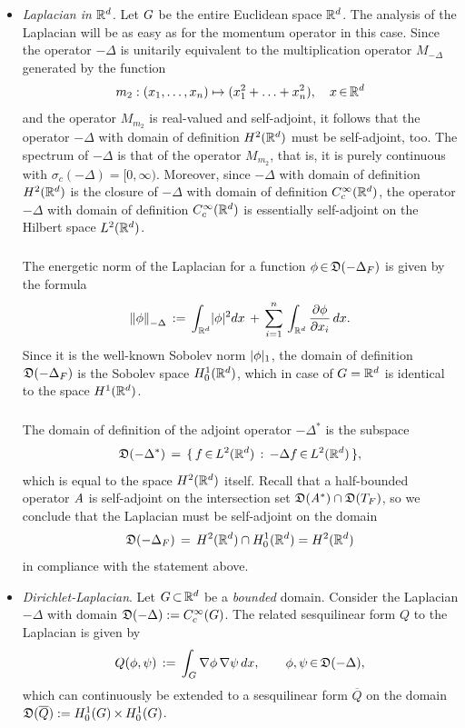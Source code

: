 \documentclass[11pt,twoside]{article}
\begin{document}
\begin{itemize}[leftmargin=5mm]
\item[1.]
\textit{Laplacian in ${\mathbb{R}}^d$}.
Let $G$ be the entire Euclidean space ${\mathbb{R}}^d$.
The analysis of the Laplacian will be as easy as for the momentum operator
in this case.
Since the operator $-\Delta$ is unitarily equivalent to
the multiplication operator $M_{-\Delta}$ generated by the function
\[
m_2:(x_1,\ldots,x_n) \mapsto (x_1^2 + \ldots + x_n^2), \quad x {\,\in\,} {\mathbb{R}}^d
\]
and the operator $M_{m_2}$ is real-valued and self-adjoint,
it follows
that the operator $-\Delta$ with domain of definition $H^2({\mathbb{R}}^d)$
must be self-adjoint,
too.
The spectrum of $-\Delta$ is that of the operator $M_{m_2}$,
that is,
it is purely continuous with $\sigma_c(-\Delta)=[0,\infty)$.
Moreover,
since $-\Delta$ with domain of definition $H^2({\mathbb{R}}^d)$
is the closure of $-\Delta$ with domain of definition $C_c^{\infty}({\mathbb{R}}^d)$, 
the operator $-\Delta$ with domain of definition $C_c^{\infty}({\mathbb{R}}^d)$ is
essentially self-adjoint on the Hilbert space $L^2({\mathbb{R}}^d)$.

\subparagraph*{}
The energetic norm of the Laplacian for a function
$\phi {\,\in\,} \mathfrak{D}(-\Delta_F)$ is given by the formula
\[
\norm{\phi}_{-\Delta} \eqdef
\int_{\Rd} \abs{\phi} ^2 dx 
\, + \,
\sum_{i=1}^n \, \int_{\Rd} \frac{\partial \phi}{\partial x_i} \, dx.
\] 
Since it is the well-known Sobolev norm $\abs{\phi} _1$,
the domain of definition $\mathfrak{D}(-\Delta_F)$ is the Sobolev space $H_0^1({\mathbb{R}}^d)$,
which in case of $G={\mathbb{R}}^d$ is identical to the space $H^1({\mathbb{R}}^d)$.

\subparagraph*{}
The domain of definition of the adjoint operator $-\Delta^*$ is the subspace
\[
\mathfrak{D}(-\Delta^*) \,=\, \{ \, f {\,\in\,} L^2({\mathbb{R}}^d) \,: \, -\Delta f {\,\in\,} L^2({\mathbb{R}}^d) \, \},
\]
which is equal to the space $H^2({\mathbb{R}}^d)$ itself.
Recall
that a half-bounded operator $\mathit{A}$ is self-adjoint on the intersection set
$\mathfrak{D}(\mathit{A}^*) \cap \mathfrak{D}(T_F)$,
so we conclude
that the Laplacian must be self-adjoint on the domain
\[
\mathfrak{D}(-\Delta_F) \,=\, H^2({\mathbb{R}}^d) \cap H_0^1({\mathbb{R}}^d) =H^2({\mathbb{R}}^d)
\]
in compliance with the statement above.

\item[2.]
\textit{Dirichlet-Laplacian}.
Let $G {\,\subset\,} {\mathbb{R}}^d$ be a \textit{bounded} domain.
Consider the Laplacian $-\Delta$ with domain
$\mathfrak{D}(-\Delta):=C_c^{\infty}(G)$.
The related sesquilinear form $Q$ to the Laplacian is given by 
\[
Q(\phi,\psi) \,:=\, 
\int_{G} \nabla \phi \, \nabla \psi \, dx,
\quad \quad
\phi,\psi {\,\in\,} \mathfrak{D}(-\Delta),
\]
which can continuously be extended to a sesquilinear form $\overline{Q}$
on the domain
$\mathfrak{D}(\overline{Q}) := H_0^{1}(G) {\,\times\,} H_0^{1}(G)$.


\end{itemize}
\end{document}
